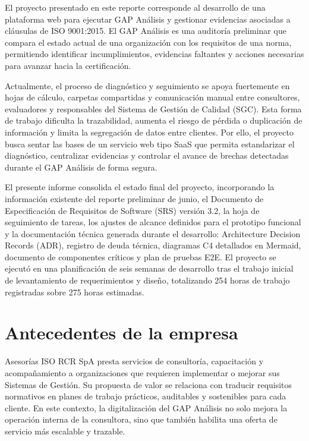 \documentclass[final]{udpthesis}
\begin{document}
El proyecto presentado en este reporte corresponde al desarrollo de una plataforma web para ejecutar GAP Análisis y gestionar evidencias asociadas a cláusulas de ISO 9001:2015. El GAP Análisis es una auditoría preliminar que compara el estado actual de una organización con los requisitos de una norma, permitiendo identificar incumplimientos, evidencias faltantes y acciones necesarias para avanzar hacia la certificación.

Actualmente, el proceso de diagnóstico y seguimiento se apoya fuertemente en hojas de cálculo, carpetas compartidas y comunicación manual entre consultores, evaluadores y responsables del Sistema de Gestión de Calidad (SGC). Esta forma de trabajo dificulta la trazabilidad, aumenta el riesgo de pérdida o duplicación de información y limita la segregación de datos entre clientes. Por ello, el proyecto busca sentar las bases de un servicio web tipo SaaS que permita estandarizar el diagnóstico, centralizar evidencias y controlar el avance de brechas detectadas durante el GAP Análisis de forma segura.

El presente informe consolida el estado final del proyecto, incorporando la información existente del reporte preliminar de junio, el Documento de Especificación de Requisitos de Software (SRS) versión 3.2, la hoja de seguimiento de tareas, los ajustes de alcance definidos para el prototipo funcional y la documentación técnica generada durante el desarrollo: Architecture Decision Records (ADR), registro de deuda técnica, diagramas C4 detallados en Mermaid, documento de componentes críticos y plan de pruebas E2E. El proyecto se ejecutó en una planificación de seis semanas de desarrollo tras el trabajo inicial de levantamiento de requerimientos y diseño, totalizando 254 horas de trabajo registradas sobre 275 horas estimadas.

\chapter{Antecedentes de la empresa}

Asesorías ISO RCR SpA presta servicios de consultoría, capacitación y acompañamiento a organizaciones que requieren implementar o mejorar sus Sistemas de Gestión. Su propuesta de valor se relaciona con traducir requisitos normativos en planes de trabajo prácticos, auditables y sostenibles para cada cliente. En este contexto, la digitalización del GAP Análisis no solo mejora la operación interna de la consultora, sino que también habilita una oferta de servicio más escalable y trazable.
\end{document}
